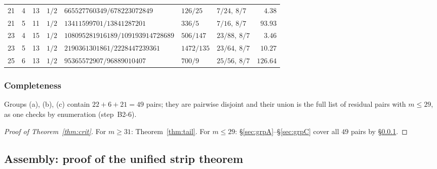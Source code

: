 \documentclass[11pt]{article}
\theoremstyle{remark}
\theoremstyle{plain}
\theoremstyle{plain}
\begin{document}
\begin{table}[ht]
\begin{tabular}{@{}rrrllllr@{}}
21&4&13&$1/2$  &$665527760349/678223072849$      &$126/25$ &$7/24,\ 8/7$    &$4.38$\\
21&5&11&$1/2$  &$13411599701/13841287201$        &$336/5$  &$7/16,\ 8/7$    &$93.93$\\
23&4&15&$1/2$  &$108095281916189/109193914728689$&$506/147$&$23/88,\ 8/7$   &$3.46$\\
23&5&13&$1/2$  &$2190361301861/2228447239361$    &$1472/135$&$23/64,\ 8/7$  &$10.27$\\
25&6&13&$1/2$  &$95365572907/96889010407$        &$700/9$  &$25/56,\ 8/7$   &$126.64$\\
\bottomrule
\end{tabular}
\end{table}

\subsubsection{Completeness}\label{sec:complete}
Groups (a), (b), (c) contain $22+6+21=49$ pairs; they are pairwise disjoint and their union is the full list of residual pairs with $m\le29$, as one checks by enumeration (step~B2-6).

\begin{proof}[Proof of Theorem~\ref{thm:crit}]
For $m\ge31$: Theorem~\ref{thm:tail}.  For $m\le29$: \S\ref{sec:grpA}--\S\ref{sec:grpC} cover all $49$ pairs by \S\ref{sec:complete}.
\end{proof}

\subsection{Assembly: proof of the unified strip theorem}\label{sec:assembly}
\end{document}
